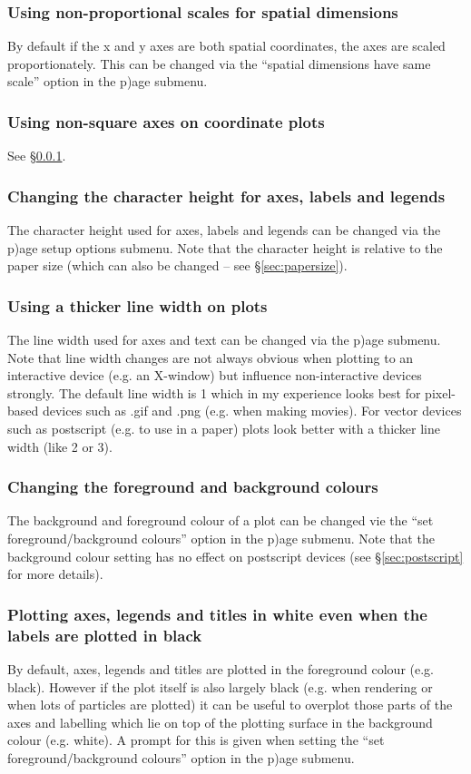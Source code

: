 \documentclass[a4paper,10pt]{article}
\begin{document}
\subsubsection{ Using non-proportional scales for spatial dimensions}
\label{sec:squarexy}
 By default if the x and y axes are both spatial coordinates, the axes are scaled proportionately. This can be changed via the ``spatial dimensions have same scale'' option in the p)age submenu.

\subsubsection{ Using non-square axes on coordinate plots}
 See \S\ref{sec:squarexy}.
 
\subsubsection{ Changing the character height for axes, labels and legends}
 The character height used for axes, labels and legends can be changed via the p)age setup options submenu. Note that the character height is relative to the paper size (which can also be changed -- see \S\ref{sec:papersize}).

\subsubsection{ Using a thicker line width on plots}
 The line width used for axes and text can be changed via the p)age submenu. Note that line width changes are not always obvious when plotting to an interactive device (e.g. an X-window) but influence non-interactive devices strongly. The default line width is 1 which in my experience looks best for pixel-based devices such as .gif and .png (e.g. when making movies). For vector devices such as postscript (e.g. to use in a paper) plots look better with a thicker line width (like 2 or 3). 

\subsubsection{ Changing the foreground and background colours}
\label{sec:pagecolours}
 The background and foreground colour of a plot can be changed vie the ``set foreground/background colours'' option in the p)age submenu. Note that the background colour setting has no effect on postscript devices (see \S\ref{sec:postscript} for more details).

\subsubsection{ Plotting axes, legends and titles in white even when the labels are plotted in black}
 By default, axes, legends and titles are plotted in the foreground colour (e.g. black). However if the plot itself is also largely black (e.g. when rendering or when lots of particles are plotted) it can be useful to overplot those parts of the axes and labelling which lie on top of the plotting surface in the background colour (e.g. white). A prompt for this is given when setting the ``set foreground/background colours'' option in the p)age submenu. 
 
\end{document}
